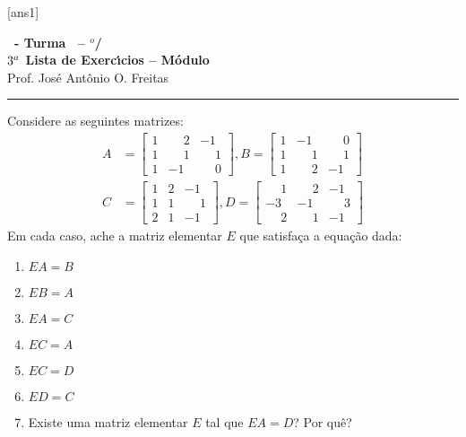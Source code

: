 \documentclass[12pt]{exam}
\begin{document}
  [ans1]
  \begin{center}
    {\Large\bf \disciplina\ - Turma \turma\ -- \semestre$^{o}$/\ano} \\ \vspace{9pt} {\large\bf
        $3^a$ Lista de Exerc{\'\i}cios -- Módulo \numeromodulo}\\ \vspace{9pt} Prof. Jos{\'e} Ant{\^o}nio O. Freitas
  \end{center}
  \hrule


\begin{exercicio}
  Considere as seguintes matrizes:
  \begin{align*}
    A &= \begin{bmatrix}1 & \phantom{-}2 & -1\\1 & \phantom{-} 1 & \phantom{-} 1\\1 & -1 & \phantom{-} 0\end{bmatrix},
    B = \begin{bmatrix}1 & -1 & \phantom{-} 0\\1 & \phantom{-} 1 & \phantom{-} 1\\1 & \phantom{-} 2 & -1\end{bmatrix}\\
    C &= \begin{bmatrix}1 & 2 & -1\\1 & 1 & \phantom{-} 1\\2 & 1 & -1\end{bmatrix},
    D = \begin{bmatrix}\phantom{-} 1 & \phantom{-} 2 & -1\\-3 & -1 & \phantom{-} 3\\\phantom{-} 2 & \phantom{-} 1 & -1\end{bmatrix}
  \end{align*}
  Em cada caso, ache a matriz elementar $E$ que satisfaça a equação dada:
  \begin{multicols}{3}
    \begin{enumerate}[label={\alph*})]
      \item $EA = B$
      \item $EB = A$
      \item $EA = C$
      \item $EC = A$
      \item $EC = D$
      \item $ED = C$
      \item Existe uma matriz elementar $E$ tal que $EA = D$? Por quê?
    \end{enumerate}
  \end{multicols}
\end{exercicio}
\end{document}
